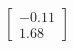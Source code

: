 \documentclass[preview]{standalone}
\begin{document}
\begin{align*}
\begin{bmatrix} -0.11 \\ 1.68 \end{bmatrix}
\end{align*}
\end{document}
